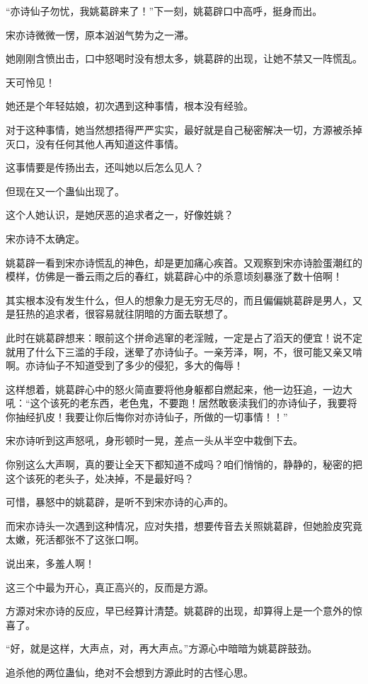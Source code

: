 \begin{this_body}
“亦诗仙子勿忧，我姚葛辟来了！”下一刻，姚葛辟口中高呼，挺身而出。

宋亦诗微微一愣，原本汹汹气势为之一滞。

她刚刚含愤出击，口中怒喝时没有想太多，姚葛辟的出现，让她不禁又一阵慌乱。

天可怜见！

她还是个年轻姑娘，初次遇到这种事情，根本没有经验。

对于这种事情，她当然想捂得严严实实，最好就是自己秘密解决一切，方源被杀掉灭口，没有任何其他人再知道这件事情。

这事情要是传扬出去，还叫她以后怎么见人？

但现在又一个蛊仙出现了。

这个人她认识，是她厌恶的追求者之一，好像姓姚？

宋亦诗不太确定。

姚葛辟一看到宋亦诗慌乱的神色，却是更加痛心疾首。又观察到宋亦诗脸蛋潮红的模样，仿佛是一番云雨之后的春红，姚葛辟心中的杀意顷刻暴涨了数十倍啊！

其实根本没有发生什么，但人的想象力是无穷无尽的，而且偏偏姚葛辟是男人，又是狂热的追求者，很容易就往阴暗的方面去联想了。

此时在姚葛辟想来：眼前这个拼命逃窜的老淫贼，一定是占了滔天的便宜！说不定就用了什么下三滥的手段，迷晕了亦诗仙子。一亲芳泽，啊，不，很可能又亲又啃啊。亦诗仙子不知道受到了多少的侵犯，多大的侮辱！

这样想着，姚葛辟心中的怒火简直要将他身躯都自燃起来，他一边狂追，一边大吼：“这个该死的老东西，老色鬼，不要跑！居然敢亵渎我们的亦诗仙子，我要将你抽经扒皮！我要让你后悔你对亦诗仙子，所做的一切事情！！”

宋亦诗听到这声怒吼，身形顿时一晃，差点一头从半空中栽倒下去。

你别这么大声啊，真的要让全天下都知道不成吗？咱们悄悄的，静静的，秘密的把这个该死的老头子，处决掉，不是最好吗？

可惜，暴怒中的姚葛辟，是听不到宋亦诗的心声的。

而宋亦诗头一次遇到这种情况，应对失措，想要传音去关照姚葛辟，但她脸皮究竟太嫩，死活都张不了这张口啊。

说出来，多羞人啊！

这三个中最为开心，真正高兴的，反而是方源。

方源对宋亦诗的反应，早已经算计清楚。姚葛辟的出现，却算得上是一个意外的惊喜了。

“好，就是这样，大声点，对，再大声点。”方源心中暗暗为姚葛辟鼓劲。

追杀他的两位蛊仙，绝对不会想到方源此时的古怪心思。


\end{this_body}
